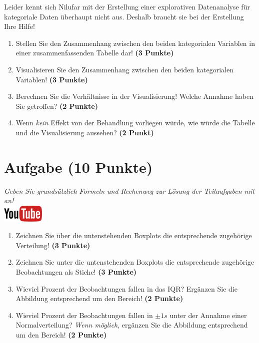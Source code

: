 \documentclass[a4paper, 9pt]{scrartcl}\usepackage[]{graphicx}\usepackage[]{xcolor}
\begin{document}
\vspace{2Ex}

Leider kennt sich Nilufar mit der Erstellung einer explorativen Datenanalyse für kategoriale Daten überhaupt nicht aus. Deshalb braucht sie bei der Erstellung Ihre Hilfe!

\begin{enumerate}
\item Stellen Sie den Zusammenhang zwischen den beiden kategorialen Variablen in einer zusammenfassenden Tabelle dar! \textbf{(3 Punkte)}
\item Visualisieren Sie den Zusammenhang zwischen den beiden kategorialen Variablen! \textbf{(3 Punkte)}
\item Berechnen Sie die Verhältnisse in der Visualisierung! Welche Annahme haben Sie getroffen? \textbf{(2 Punkte)}
\item Wenn \textit{kein} Effekt von der Behandlung vorliegen würde, wie würde die Tabelle und die Visualisierung aussehen? \textbf{(2 Punkt)}
\end{enumerate} 
\clearpage

\section{Aufgabe \hfill (10 Punkte)}

\textit{Geben Sie grunds{\"a}tzlich Formeln und Rechenweg zur L{\"o}sung der
  Teilaufgaben mit an!} \\[1Ex]

\hfill\href{https://youtu.be/Op-gjzASH9I}{\includegraphics[width =
  2cm]{img/youtube}}\\[1Ex]



\begin{enumerate}
\item Zeichnen Sie {\"u}ber die untenstehenden Boxplots die entsprechende
  zugeh{\"o}rige Verteilung! \textbf{(3 Punkte)} 
\item Zeichnen Sie unter die untenstehenden Boxplots die entsprechende
  zugeh{\"o}rige Beobachtungen als Stiche! \textbf{(3 Punkte)}
\item Wieviel Prozent der Beobachtungen fallen in das IQR? Erg{\"a}nzen Sie die
  Abbildung entsprechend um den Bereich! \textbf{(2 Punkte)}
\item Wieviel Prozent der Beobachtungen fallen in $\pm 1s$ unter
  der Annahme einer Normalverteilung?  \textit{Wenn m{\"o}glich}, erg{\"a}nzen Sie
  die Abbildung entsprechend um den Bereich! \textbf{(2 Punkte)}
\end{enumerate}
\end{document}
